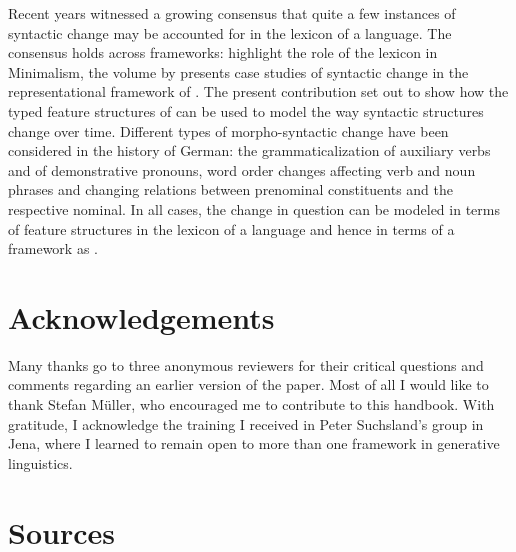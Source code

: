 \documentclass[output=paper
                ,modfonts
                ,nonflat
	        ,collection
	        ,collectionchapter
	        ,collectiontoclongg
 	        ,biblatex
                ,babelshorthands
                ,newtxmath
                ,draftmode
                ,colorlinks, citecolor=brown
]{./langsci/langscibook}
\begin{document}
Recent years witnessed a growing consensus that quite a few  instances of syntactic change may be accounted for in the lexicon of a language. The consensus holds across frameworks: \cite{BiWa2015} highlight the role of the lexicon in Minimalism, the volume by \cite{BuKi2001} presents case studies of syntactic change in the representational framework of \lfg. The present contribution set out to show how the typed feature structures of \hpsg can be used to model the way syntactic structures change over time. Different types of morpho-syntactic change have been considered in the history of German: the grammaticalization of auxiliary verbs and of demonstrative pronouns, word order changes affecting verb and noun phrases and changing relations between prenominal constituents and the respective nominal. In all cases, the change in question can be modeled in terms of feature structures in the lexicon of a language and hence in terms of a framework as \hpsg.  


\section*{Acknowledgements}
Many thanks go to three anonymous reviewers for their critical questions and comments regarding an earlier version of the paper. Most of all I would like to thank Stefan Müller, who encouraged me to contribute to this handbook. With gratitude, I acknowledge the training I received in Peter Suchsland's group in Jena, where I learned to remain open to more than one framework in generative linguistics.

\section*{Sources}
\end{document}
